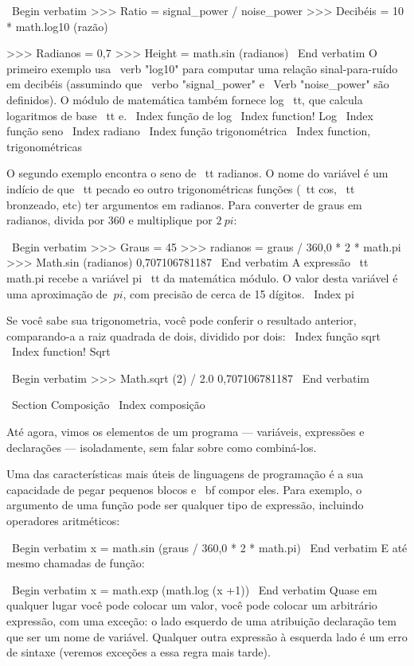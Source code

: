 \documentclass[10pt]{book}
\begin{document}
{\ Begin {verbatim}
>>> Ratio = signal_power / noise_power
>>> Decibéis = 10 * math.log10 (razão)

>>> Radianos = 0,7
>>> Height = math.sin (radianos)
\ End {verbatim}
%
O primeiro exemplo usa \ verb "log10" para computar 
uma relação sinal-para-ruído em decibéis (assumindo que \ verbo "signal_power" e
\ Verb "noise_power" são definidos). O módulo de matemática também fornece {log \ tt},
que calcula logaritmos de base {\ tt e}.
\ Index {função de log}
\ Index {function! Log}
\ Index {função seno}
\ Index {} radiano
\ Index {função trigonométrica}
\ Index {function, trigonométricas}

O segundo exemplo encontra o seno de {\ tt radianos}. O nome do
variável é um indício de que {\ tt pecado} eo outro trigonométricas
funções ({\ tt cos}, {\ tt bronzeado}, etc) ter argumentos em radianos. Para
converter de graus em radianos, divida por 360 e multiplique por
$ 2 \ pi $:

\ Begin {verbatim}
>>> Graus = 45
>>> radianos = graus / 360,0 * 2 * math.pi
>>> Math.sin (radianos)
0,707106781187
\ End {verbatim}
%
A expressão {\ tt math.pi} recebe a variável {pi \ tt} da matemática
módulo. O valor desta variável é uma aproximação
de $ \ pi $, com precisão de cerca de 15 dígitos.
\ Index {pi}

Se você sabe
sua trigonometria, você pode conferir o resultado anterior, comparando-a
a raiz quadrada de dois, dividido por dois:
\ Index {função sqrt}
\ Index {function! Sqrt}

\ Begin {verbatim}
>>> Math.sqrt (2) / 2.0
0,707106781187
\ End {verbatim}
%

\ Section {Composição}
\ Index {composição}

Até agora, vimos os elementos de um programa --- variáveis,
expressões e declarações --- isoladamente, sem falar sobre como
combiná-los.

Uma das características mais úteis de linguagens de programação é a sua
capacidade de pegar pequenos blocos e {\ bf compor} eles. Para
exemplo, o argumento de uma função pode ser qualquer tipo de expressão,
incluindo operadores aritméticos:

\ Begin {verbatim}
x = math.sin (graus / 360,0 * 2 * math.pi)
\ End {verbatim}
%
E até mesmo chamadas de função:

\ Begin {verbatim}
x = math.exp (math.log (x +1))
\ End {verbatim}
%
Quase em qualquer lugar você pode colocar um valor, você pode colocar um arbitrário
expressão, com uma exceção: o lado esquerdo de uma atribuição
declaração tem que ser um nome de variável. Qualquer outra expressão à esquerda
lado é um erro de sintaxe (veremos exceções a essa regra
mais tarde).

}
\end{document}
